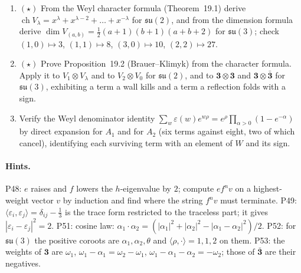 \documentclass[11pt]{article}
\newcommand{\Z}{\mathbb{Z}}
\begin{document}
\begin{enumerate}[label=\textbf{P\arabic*.},leftmargin=*,start=48]
  $\begin{psmallmatrix}2&-1\\-1&2\end{psmallmatrix}$, its six shortest vectors
  form $A_2$, their reflections preserve the lattice and generate $S_3$, and
  the dual lattice is $P = A^{-1}\Z^2$ with $|P/Q| = 3$. Which of these facts
  uses only scalar length data, and what would a boundary triangulation have
  to satisfy for its harmonic mass Gram to equal $A$?
\item $(\star)$ From the Weyl character formula (Theorem~19.1) derive
  $\operatorname{ch}V_\lambda = x^{\lambda}+x^{\lambda-2}+\dots+x^{-\lambda}$
  for $\mathfrak{su}(2)$, and from the dimension formula derive
  $\dim V_{(a,b)} = \tfrac12(a+1)(b+1)(a+b+2)$ for $\mathfrak{su}(3)$; check
  $(1,0)\mapsto3$, $(1,1)\mapsto8$, $(3,0)\mapsto10$, $(2,2)\mapsto27$.
\item $(\star)$ Prove Proposition~19.2 (Brauer--Klimyk) from the
  character formula. Apply it to $V_1\otimes V_\lambda$ and to
  $V_2\otimes V_0$ for $\mathfrak{su}(2)$, and to
  $\mathbf3\otimes\mathbf3$ and $\mathbf3\otimes\bar{\mathbf3}$ for
  $\mathfrak{su}(3)$, exhibiting a term a wall kills and a term a reflection
  folds with a sign.
\item Verify the Weyl denominator identity
  $\sum_w\varepsilon(w)e^{w\rho} = e^{\rho}\prod_{\alpha>0}(1-e^{-\alpha})$
  by direct expansion for $A_1$ and for $A_2$ (six terms against eight, two
  of which cancel), identifying each surviving term with an element of $W$
  and its sign.
\end{enumerate}

\paragraph{Hints.} P48: $e$ raises and $f$ lowers the
$h$-eigenvalue by $2$; compute $e f^{n}v$ on a highest-weight vector $v$ by
induction and find where the string $f^{n}v$ must terminate. P49: $\langle\varepsilon_i,\varepsilon_j\rangle = \delta_{ij}-\tfrac13$
is the trace form restricted to the traceless part; it gives
$|\varepsilon_i-\varepsilon_j|^2 = 2$. P51: cosine law: $\alpha_1\cdot\alpha_2 = (|\alpha_1|^2+|\alpha_2|^2-|\alpha_1-\alpha_2|^2)/2$. P52: for $\mathfrak{su}(3)$ the positive coroots are $\alpha_1,\alpha_2,\theta$ and
$\langle\rho,\cdot\rangle = 1,1,2$ on them. P53: the weights of $\mathbf3$ are $\omega_1$, $\omega_1-\alpha_1 = \omega_2-\omega_1$,
$\omega_1-\alpha_1-\alpha_2 = -\omega_2$; those of $\bar{\mathbf3}$ are
their negatives.
\end{document}
